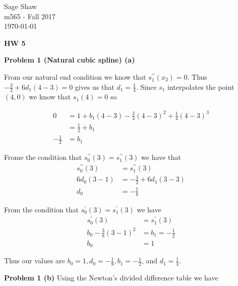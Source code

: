 \documentclass[12pt]{article}
\newcommand{\problem}[1]{\hspace{-4 ex} \large \textbf{Problem #1} }
\begin{document}
	\thispagestyle{empty}
	
	\begin{flushright}
		Sage Shaw \\
		m565 - Fall 2017 \\
		\today
	\end{flushright}
	
{\large \textbf{HW 5}}\bigbreak

\problem{1 (Natural cubic spline) (a)} 

	From our natural end condition we know that $s_1^{\prime\prime}(x_2)=0$. Thus \\$-\tfrac{3}{2} + 6d_1(4-3) = 0$ gives us that $d_1 = \tfrac{1}{4}$. Since $s_1$ interpolates the point $(4,0)$ we know that $s_1(4)=0$ so 

	\begin{align*}
		0 & = 1 + b_1(4-3) - \tfrac{3}{4}(4-3)^2 + \tfrac{1}{4}(4-3)^3\\
		& = \tfrac{1}{2} + b_1 \\
		-\tfrac{1}{2} & = b_1
	\end{align*}

	Frome the condition that $s_0^{\prime\prime}(3) = s_1^{\prime\prime}(3)$ we have that
	\begin{align*}
		s_0^{\prime\prime}(3) & = s_1^{\prime\prime}(3) \\
		6d_0(3-1) & = -\tfrac{3}{2} + 6d_1(3-3) \\
		d_0 & = -\tfrac{1}{8}
	\end{align*}

	From the condition that $s_0^\prime(3) = s_1^\prime(3)$ we have
	\begin{align*}
		s_0^\prime(3) & = s_1^\prime(3)\\
		b_0 - \tfrac{3}{8}(3-1)^2 & = b_1 = -\tfrac{1}{2} \\
		b_0 & = 1
	\end{align*}
	
	Thus our values are $b_0 = 1, d_0 =-\tfrac{1}{8}, b_1 = -\tfrac{1}{2}$, and $ d_1 = \tfrac{1}{4}$. 
	
\problem{1 (b)} Using the Newton's divided difference table we have
\end{document}
